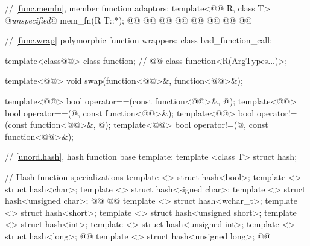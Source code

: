 \documentclass[american,twoside]{book}
\begin{document}
\begin{codeblock}
{  // \marktr{}\ref{func.memfn}, member function adaptors:
  template<@@ R, class T> @\textit{unspecified}@ mem_fn(R T::*);
  @@
    @@
  @@
    @@
  @@
    @@
  @@
    @@

  // \marktr{}\ref{func.wrap} polymorphic function wrappers:
  class bad_function_call;

  template<class@@> class function; // 
  @@
    class function<R(ArgTypes...)>;

  template<@@>
    void swap(function<@@>&, function<@@>&);

  template<@@>
    bool operator==(const function<@@>&, @\unspecnull@);
  template<@@>
    bool operator==(@\unspecnull@, const function<@@>&);
  template<@@>
    bool operator!=(const function<@@>&, @\unspecnull@);
  template<@@>
    bool operator!=(@\unspecnull@, const function<@@>&);

  // \marktr{}\ref{unord.hash}, hash function base template:
  template <class T> struct hash;

  // Hash function specializations
  template <> struct hash<bool>;
  template <> struct hash<char>;
  template <> struct hash<signed char>;
  template <> struct hash<unsigned char>;
  @@
  @@
  template <> struct hash<wchar_t>;
  template <> struct hash<short>;
  template <> struct hash<unsigned short>;
  template <> struct hash<int>;
  template <> struct hash<unsigned int>;
  template <> struct hash<long>;
  @@
  template <> struct hash<unsigned long>;
  @@

}
\end{codeblock}
\end{document}
